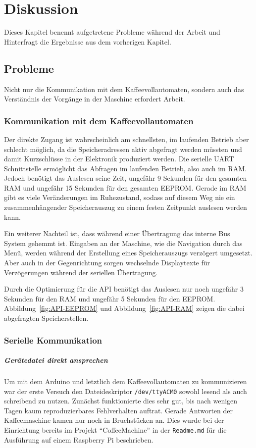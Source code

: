 \chapter{Diskussion}\label{ch:Diskussion}
Dieses Kapitel benennt aufgetretene Probleme während der Arbeit und Hinterfragt die Ergebnisse aus dem vorherigen Kapitel.

\section{Probleme}
Nicht nur die Kommunikation mit dem Kaffeevollautomaten, sondern auch das Verständnis der Vorgänge in der Maschine erfordert Arbeit.

\subsection{Kommunikation mit dem Kaffeevollautomaten} \label{subsec:zugangSeriellDirekt}
Der direkte Zugang ist wahrscheinlich am schnellsten, im laufenden Betrieb aber schlecht möglich, da die Speicheradressen aktiv abgefragt werden müssten und damit Kurzschlüsse in der Elektronik produziert werden.
Die serielle \ac{UART} Schnittstelle ermöglicht das Abfragen im laufenden Betrieb, also auch im \ac{RAM}.
Jedoch benötigt das Auslesen seine Zeit, ungefähr 9 Sekunden für den gesamten \ac{RAM} und ungefähr 15 Sekunden für den gesamten \ac{EEPROM}.
Gerade im \ac{RAM} gibt es viele Veränderungen im Ruhezustand, sodass auf diesem Weg nie ein zusammenhängender Speicherauszug zu einem festen Zeitpunkt auslesen werden kann.

Ein weiterer Nachteil ist, dass während einer Übertragung das interne Bus System gehemmt ist.
Eingaben an der Maschine, wie die Navigation durch das Menü, werden während der Erstellung eines Speicherauszugs verzögert umgesetzt.
Aber auch in der Gegenrichtung sorgen wechselnde Displaytexte für Verzögerungen während der seriellen Übertragung.

Durch die Optimierung für die \ac{API} benötigt das Auslesen nur noch ungefähr 3 Sekunden für den \ac{RAM} und ungefähr 5 Sekunden für den \ac{EEPROM}.
Abbildung~\ref{fig:API-EEPROM} und Abbildung~\ref{fig:API-RAM} zeigen die dabei abgefragten Speicherstellen.

\subsection{Serielle Kommunikation} \label{subsec:kommunikationGeraetedateiLibserialLibrary}
\paragraph{Gerätedatei direkt ansprechen}
Um mit dem Arduino und letztlich dem Kaffeevollautomaten zu kommunizieren war der erste Versuch den Dateideskriptor \texttt{/dev/ttyACM0} sowohl lesend als auch schreibend zu nutzen.
Zunächst funktionierte dies sehr gut, bis nach wenigen Tagen kaum reproduzierbares Fehlverhalten auftrat.
Gerade Antworten der Kaffeemaschine kamen nur noch in Bruchstücken an.
Dies wurde bei der Einrichtung bereits im Projekt "`CoffeeMachine"'\cite{GitCoffeeMachine} in der \texttt{Readme.md} für die Ausführung auf einem Raspberry Pi beschrieben.

